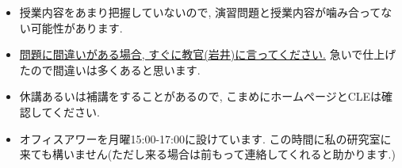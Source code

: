 \documentclass[dvipdfmx,a4paper,11pt]{article}
\theoremstyle{definition}
\begin{document}
\vspace{11pt}
\hspace{-18pt}{\Large その他}
\begin{itemize}
  \setlength{\parskip}{0cm} %
  \setlength{\itemsep}{0cm} %
    \item 授業内容をあまり把握していないので, 演習問題と授業内容が噛み合ってない可能性があります.
    \item \underline{問題に間違いがある場合, すぐに教官(岩井)に言ってください.} 急いで仕上げたので間違いは多くあると思います. 
  \item 休講あるいは補講をすることがあるので, こまめにホームページとCLEは確認してください.
    \item オフィスアワーを月曜15:00-17:00に設けています. この時間に私の研究室に来ても構いません(ただし来る場合は前もって連絡してくれると助かります.)
 \end{itemize}

 
\end{document}
